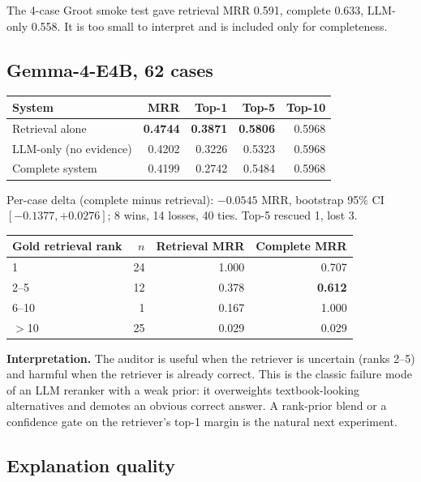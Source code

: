 \documentclass[11pt,a4paper]{article}
\begin{document}
The 4-case Groot smoke test gave retrieval MRR 0.591, complete 0.633, LLM-only
0.558. It is too small to interpret and is included only for completeness.

\subsection{Gemma-4-E4B, 62 cases}

\begin{center}
\begin{tabular}{lrrrr}
\toprule
System & MRR & Top-1 & Top-5 & Top-10\\
\midrule
Retrieval alone & \textbf{0.4744} & \textbf{0.3871} & \textbf{0.5806} & 0.5968\\
LLM-only (no evidence) & 0.4202 & 0.3226 & 0.5323 & 0.5968\\
Complete system & 0.4199 & 0.2742 & 0.5484 & 0.5968\\
\bottomrule
\end{tabular}
\end{center}

Per-case delta (complete minus retrieval): \textbf{$-0.0545$} MRR, bootstrap 95\%
CI $[-0.1377, +0.0276]$; 8 wins, 14 losses, 40 ties. Top-5 rescued 1, lost 3.

\begin{center}
\begin{tabular}{lrrr}
\toprule
Gold retrieval rank & $n$ & Retrieval MRR & Complete MRR\\
\midrule
1 & 24 & 1.000 & 0.707\\
2--5 & 12 & 0.378 & \textbf{0.612}\\
6--10 & 1 & 0.167 & 1.000\\
$>$10 & 25 & 0.029 & 0.029\\
\bottomrule
\end{tabular}
\end{center}

\textbf{Interpretation.} The auditor is useful when the retriever is uncertain
(ranks 2--5) and harmful when the retriever is already correct. This is the classic
failure mode of an LLM reranker with a weak prior: it overweights textbook-looking
alternatives and demotes an obvious correct answer. A rank-prior blend or a
confidence gate on the retriever's top-1 margin is the natural next experiment.

\subsection{Explanation quality}
\end{document}
